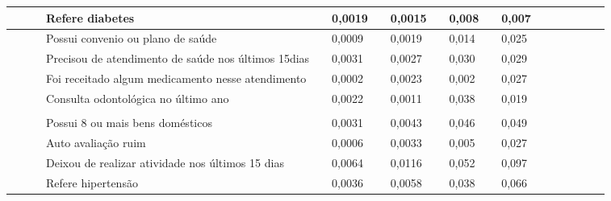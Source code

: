 \documentclass{article}
\begin{document}
\begin{tabular}{| l | l | l | l | l | l || l | l | l | l || l | l | l | l | l | l | l | l |}
 & 
 & %
 & Refere diabetes
 & %
 & 0,0019
 & %
 & 0,0015
 & %
 & 0,008
 & %
 & 0,007
\\ \hline 

 & 
 & %
 & Possui convenio ou plano de saúde
 & %
 & 0,0009
 & %
 & 0,0019
 & %
 & 0,014
 & %
 & 0,025
\\ \hline 

 & 
 & %
 & Precisou de atendimento de saúde nos últimos 15dias
 & %
 & 0,0031
 & %
 & 0,0027
 & %
 & 0,030
 & %
 & 0,029
\\ \hline 

 & 
 & %
 & Foi receitado algum medicamento nesse atendimento
 & %
 & 0,0002
 & %
 & 0,0023
 & %
 & 0,002
 & %
 & 0,027
\\ \hline 

 & 
 & %
 & Consulta odontológica no último ano
 & %
 & 0,0022
 & %
 & 0,0011
 & %
 & 0,038
 & %
 & 0,019
\\ \hline 

 & \multirow{1}{*}{\multicolumn{2}{l}{Adultos e idosos}}
 & %
 & 
 & %
 & 
 & %
 & 
\\ \hline 

 & 
 & %
 & Possui 8 ou mais bens domésticos
 & %
 & 0,0031
 & %
 & 0,0043
 & %
 & 0,046
 & %
 & 0,049
\\ \hline 

 & 
 & %
 & Auto avaliação ruim
 & %
 & 0,0006
 & %
 & 0,0033
 & %
 & 0,005
 & %
 & 0,027
\\ \hline 

 & 
 & %
 & Deixou de realizar atividade nos últimos 15 dias
 & %
 & 0,0064
 & %
 & 0,0116
 & %
 & 0,052
 & %
 & 0,097
\\ \hline 

 & 
 & %
 & Refere hipertensão
 & %
 & 0,0036
 & %
 & 0,0058
 & %
 & 0,038
 & %
 & 0,066
\\ \hline 


\end{tabular}
\end{document}
